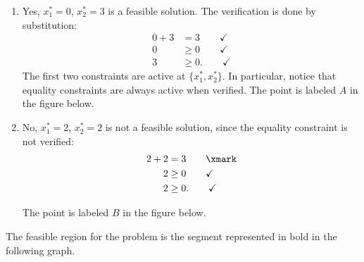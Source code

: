 \begin{enumerate}
    \item Yes, $x_1^* = 0$, $x_2^* = 3$ is a feasible solution. The verification is done by substitution:
    \begin{align}
     0 + 3 & = 3 \qquad \checkmark \nonumber  \\
     0 & \geq 0 \qquad \checkmark \nonumber  \\
     3 & \geq 0. \qquad \checkmark \nonumber 
    \end{align}
%
    The first two constraints are active at $\{x_1^*, x_2^*\}$. In
    particular, notice that equality constraints are always active
    when verified. The  point is labeled $A$ in the figure below.

    \item No, $x_1^* = 2$, $x_2^* = 2$ is not a feasible solution, since the equality constraint is not verified:
    \begin{align}
     2 + 2 & = 3 \qquad \xmark \nonumber  \\
     2 & \geq 0 \qquad \checkmark \nonumber \\
     2 & \geq 0. \qquad \checkmark \nonumber
    \end{align}
    
    The point is labeled $B$ in the figure below.
    
\end{enumerate}

The feasible region for the problem is the segment represented in bold in the following graph.
     
     \begin{center}
    \end{center}
